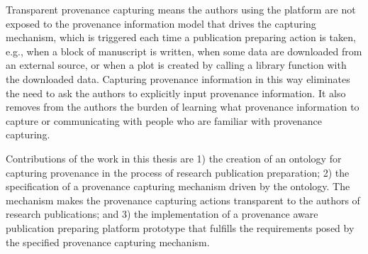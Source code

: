 Transparent provenance capturing means the authors using the platform are not exposed to the provenance information model that drives the capturing mechanism, which is triggered each time a publication preparing action is taken, e.g., when a block of manuscript is written, when some data are downloaded from an external source, or when a plot is created by calling a library function with the downloaded data. Capturing provenance information in this way eliminates the need to ask the authors to explicitly input provenance information. It also removes from the authors the burden of learning what provenance information to capture or communicating with people who are familiar with provenance capturing.

Contributions of the work in this thesis are 1) the creation of an ontology for capturing provenance in the process of research publication preparation; 2) the specification of a provenance capturing mechanism driven by the ontology. The mechanism makes the provenance capturing actions transparent to the authors of research publications; and 3) the implementation of a provenance aware publication preparing platform prototype that fulfills the requirements posed by the specified provenance capturing mechanism.

%
%
%
%
